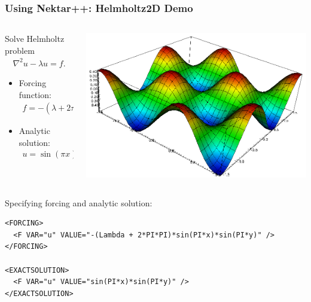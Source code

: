 \documentclass{beamer}
\numberwithin{figure}{section}
\numberwithin{equation}{section}
\begin{document}
\begin{frame}[fragile]
\frametitle{Using Nektar++: Helmholtz2D Demo}
\begin{minipage}[c][0.8\textheight][t]{\linewidth}
\begin{columns}
\begin{column}[l]{6cm}
Solve Helmholtz problem 
\begin{align*}
    \nabla^2 u - \lambda u = f.
\end{align*}
\vspace{-7mm}
\begin{itemize}
  \item Forcing function:
  \begin{align*}
  f = -(\lambda + 2\pi^2)\sin(\pi x)\sin(\pi y)
  \end{align*}
  \item Analytic solution:
  \begin{align*}
  u = \sin(\pi x)\sin(\pi y)
  \end{align*}
\end{itemize}
\end{column}
\begin{column}[r]{5cm}
\includegraphics[width=\textwidth]{Test_HEL}
\end{column}
\end{columns}
\vspace{3mm}
Specifying forcing and analytic solution:
  \begin{lstlisting}
<FORCING>
  <F VAR="u" VALUE="-(Lambda + 2*PI*PI)*sin(PI*x)*sin(PI*y)" />
</FORCING>

<EXACTSOLUTION>
  <F VAR="u" VALUE="sin(PI*x)*sin(PI*y)" />
</EXACTSOLUTION>
  \end{lstlisting}
\end{minipage}
\end{frame}
\end{document}
